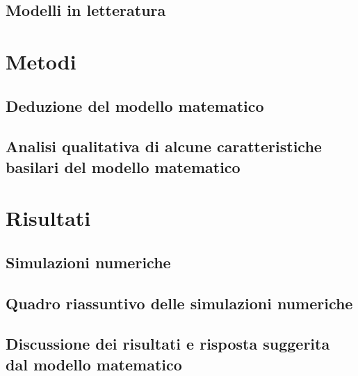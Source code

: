 \documentclass[twoside]{report} %
\begin{document}
\section{Modelli in letteratura}
\cite{vaccini_age}


\chapter{Metodi}
\section{Deduzione del modello matematico}

\section{Analisi qualitativa di alcune caratteristiche basilari del modello matematico}

\chapter{Risultati}
\section{Simulazioni numeriche}

\section{Quadro riassuntivo delle simulazioni numeriche}

\section{Discussione dei risultati e risposta suggerita dal modello matematico}



\end{document}
